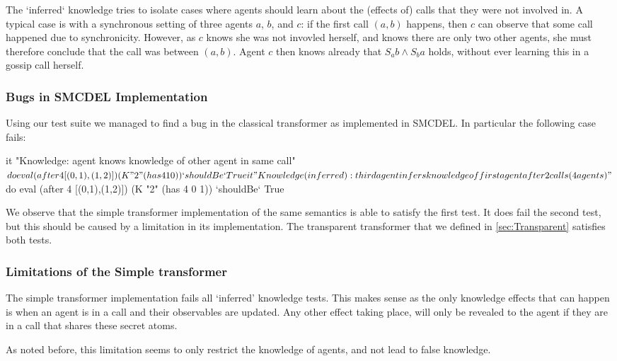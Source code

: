 The `inferred` knowledge tries to isolate cases where agents should learn about the (effects of) calls that they were not involved in.
A typical case is with a synchronous setting of three agents $a$, $b$, and $c$:
if the first call $(a,b)$ happens, then $c$ can observe that some call happened due to synchronicity.
However, as $c$ knows she was not invovled herself, and knows there are only two other agents,
she must therefore conclude that the call was between $(a,b)$.
Agent $c$ then knows already that $S_ab \land S_ba$ holds, without ever learning this in a gossip call herself.

\subsubsection{Bugs in SMCDEL Implementation}
Using our test suite we managed to find a bug in the classical transformer as implemented in SMCDEL. In particular the following case fails:
\begin{showCode}
    it "Knowledge: agent knows knowledge of other agent in same call" $ do
    eval (after 4 [(0,1),(1,2)]) (K "2" (has 4 1 0)) `shouldBe` True
    it "Knowledge (inferred): third agent infers knowledge of first agent after 2 calls (4 agents)" $ do
    eval (after 4 [(0,1),(1,2)]) (K "2" (has 4 0 1)) `shouldBe` True
\end{showCode}
We observe that the simple transformer implementation of the same semantics is able to satisfy the first test.
It does fail the second test, but this should be caused by a limitation in its implementation.
The transparent transformer that we defined in \ref{sec:Transparent} satisfies both tests.

\subsubsection{Limitations of the Simple transformer}
The simple transformer implementation fails all `inferred' knowledge tests.
This makes sense as the only knowledge effects that can happen is when an agent is in a call and their observables are updated.
Any other effect taking place, will only be revealed to the agent if they are in a call that shares these secret atoms.

As noted before, this limitation seems to only restrict the knowledge of agents, and not lead to false knowledge.